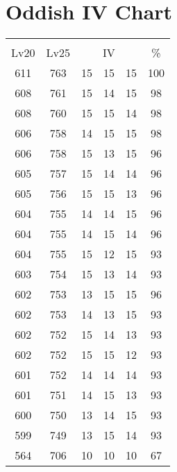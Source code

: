 \documentclass{article}%
\begin{document}
%
\normalsize%
\section{Oddish IV Chart}%
\label{sec:Oddish IV Chart}%
\renewcommand{\arraystretch}{1.5}%
\begin{tabular}{|c|c|c|c|c|c|}%
\hline%
\multicolumn{6}{|c|}{\textcolor{white}{ 
\linebreak{Oddish}
}%
\cellcolor{black}}\\%
\multicolumn{1}{|c}{Lv20}&\multicolumn{1}{c|}{Lv25}&\multicolumn{3}{c|}{IV}&\multicolumn{1}{|c|}{\%}\\%
\hline%
\rowcolor{color100}%
611&763&15&15&15&100\\%
\hline%
\rowcolor{color98}%
608&761&15&14&15&98\\%
\hline%
\rowcolor{color98}%
608&760&15&15&14&98\\%
\hline%
\rowcolor{color98}%
606&758&14&15&15&98\\%
\hline%
\rowcolor{color96}%
606&758&15&13&15&96\\%
\hline%
\rowcolor{color96}%
605&757&15&14&14&96\\%
\hline%
\rowcolor{color96}%
605&756&15&15&13&96\\%
\hline%
\rowcolor{color96}%
604&755&14&14&15&96\\%
\hline%
\rowcolor{color96}%
604&755&14&15&14&96\\%
\hline%
\rowcolor{color93}%
604&755&15&12&15&93\\%
\hline%
\rowcolor{color93}%
603&754&15&13&14&93\\%
\hline%
\rowcolor{color96}%
602&753&13&15&15&96\\%
\hline%
\rowcolor{color93}%
602&753&14&13&15&93\\%
\hline%
\rowcolor{color93}%
602&752&15&14&13&93\\%
\hline%
\rowcolor{color93}%
602&752&15&15&12&93\\%
\hline%
\rowcolor{color93}%
601&752&14&14&14&93\\%
\hline%
\rowcolor{color93}%
601&751&14&15&13&93\\%
\hline%
\rowcolor{color93}%
600&750&13&14&15&93\\%
\hline%
\rowcolor{color93}%
599&749&13&15&14&93\\%
\hline%
\rowcolor{color91}%
564&706&10&10&10&67\\%
\end{tabular}

%
\end{document}
